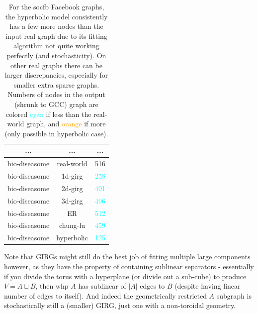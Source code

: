 \begin{table}[]
\begin{tabular}{|c|c|c|}
    ... & ... & ... \\ \hline

    bio-diseasome & real-world & 516 \\ \hline
    bio-diseasome & 1d-girg & \textcolor{cyan}{258} \\ \hline
    bio-diseasome & 2d-girg & \textcolor{cyan}{491} \\ \hline
    bio-diseasome & 3d-girg & \textcolor{cyan}{496} \\ \hline
    bio-diseasome & ER & \textcolor{cyan}{512} \\ \hline
    bio-diseasome & chung-lu & \textcolor{cyan}{459} \\ \hline
    bio-diseasome & hyperbolic & \textcolor{cyan}{125} \\ \hline

    \end{tabular}
    \caption{
    For the socfb Facebook graphs, the hyperbolic model consistently has a few more nodes than the input real graph due to its fitting algorithm not quite working perfectly (and stochasticity).
    On other real graphs there can be larger discrepancies, especially for smaller extra sparse graphs.
    Numbers of nodes in the output (shrunk to GCC) graph are colored \textcolor{cyan}{cyan} if less than the real-world graph, and \textcolor{orange}{orange} if more (only possible in hyperbolic case).
    }
    \label{tab:your_label}
\end{table}
    



Note that GIRGs might still do the best job of fitting multiple large components however, as they have the property of containing sublinear separators - essentially if you divide the torus with a hyperplane (or divide out a sub-cube) to produce $V = A \sqcup B$, then whp $A$ has sublinear of $|A|$ edges to $B$ (despite having linear number of edges to itself). And indeed the geometrically restricted $A$ subgraph is stochastically still a (smaller) GIRG, just one with a non-toroidal geometry.








